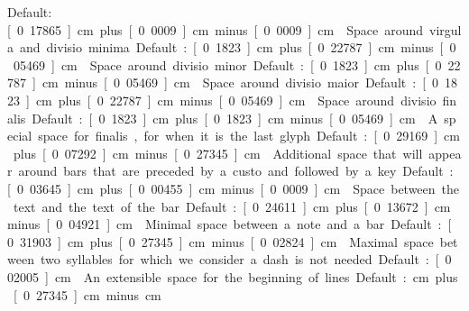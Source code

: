 Default: \unit[0.17865]{cm} plus \unit[0.0009]{cm} minus \unit[0.0009]{cm}

Space around virgula and divisio minima.  

Default: \unit[0.1823]{cm} plus \unit[0.22787]{cm} minus \unit[0.05469]{cm}

Space around divisio minor.  

Default: \unit[0.1823]{cm} plus \unit[0.22787]{cm} minus \unit[0.05469]{cm}

Space around divisio maior.  

Default: \unit[0.1823]{cm} plus \unit[0.22787]{cm} minus \unit[0.05469]{cm}

Space around divisio finalis.  

Default: \unit[0.1823]{cm} plus \unit[0.1823]{cm} minus \unit[0.05469]{cm}

A special space for finalis, for when it is the last glyph.  

Default: \unit[0.29169]{cm} plus \unit[0.07292]{cm} minus \unit[0.27345]{cm}

Additional space that will appear around bars that are preceded by a custo and followed by a key.  

Default: \unit[0.03645]{cm} plus \unit[0.00455]{cm} minus \unit[0.0009]{cm}

Space between the text and the text of the bar.  

Default: \unit[0.24611]{cm} plus \unit[0.13672]{cm} minus \unit[0.04921]{cm}

Minimal space between a note and a bar.  

Default: \unit[0.31903]{cm} plus \unit[0.27345]{cm} minus \unit[0.02824]{cm}

Maximal space between two syllables for which we consider a dash is not needed.  

Default: \unit[0.02005]{cm}

An extensible space for the beginning of lines.  

Default: \unit[0]{cm} plus \unit[0.27345]{cm} minus \unit[0]{cm}


